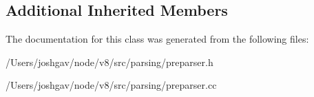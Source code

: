 \subsection*{Additional Inherited Members}


The documentation for this class was generated from the following files\+:\begin{DoxyCompactItemize}
\item 
/\+Users/joshgav/node/v8/src/parsing/preparser.\+h\item 
/\+Users/joshgav/node/v8/src/parsing/preparser.\+cc\end{DoxyCompactItemize}
